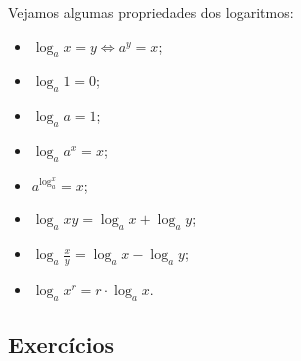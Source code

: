 \begin{obs}
  Vejamos algumas propriedades dos logaritmos:
  \begin{itemize}
  \item $\log_a x = y \Leftrightarrow a^y = x$;
  \item $\log_a 1 = 0$;
  \item $\log_a a = 1$;
  \item $\log_a a^x = x$;
  \item $a^{\log_a^x} = x$;
  \item $\log_a xy = \log_a x + \log_a y$;
  \item $\log_a \frac{x}{y} = \log_a x - \log_a y$;
  \item $\log_a x^r = r\cdot\log_a x$.
  \end{itemize}
\end{obs}

\subsection*{Exercícios}

\emconstrucao